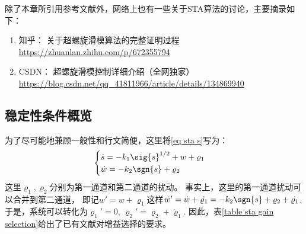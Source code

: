 除了本章所引用参考文献外，网络上也有一些关于STA算法的讨论，主要摘录如下：
\begin{enumerate}
	\item 知乎： 关于超螺旋滑模算法的完整证明过程 \url{https://zhuanlan.zhihu.com/p/672355794}
	\item CSDN： 超螺旋滑模控制详细介绍（全网独家） \url{https://blog.csdn.net/qq_41811966/article/details/134869940}
\end{enumerate}

\subsection{稳定性条件概览}

为了尽可能地兼顾一般性和行文简便，这里将\eqref{eq sta s}写为：
\begin{equation}
	\begin{cases}
		\dot{s}=-k_1 \sig{s}^{1/2}+w+\varrho_1\\
		\dot{w}=-k_2 \sgn{s}+\varrho_2
	\end{cases}
\end{equation}
这里$\varrho_1,\varrho_2$分别为第一通道和第二通道的扰动。
事实上，这里的第一通道扰动可以合并到第二通道，
即记$w'=w+\varrho_1$这样$\dot{w}'=\dot{w}+\dot{\varrho_1}=-k_2 \sgn{s}+\varrho_2+\dot{\varrho_1}$.
于是，系统可以转化为$\varrho_1'=0$, $\varrho_2'=\varrho_2+\dot{\varrho}_1$.
因此，表\ref{table sta gain selection}给出了已有文献对增益选择的要求。

